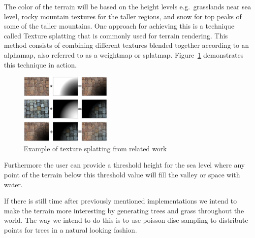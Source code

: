 The color of the terrain will be based on the height levels e.g.\ grasslands near sea level, rocky mountain textures for the taller regions, and snow for top peaks of some of the taller mountains.
One approach for achieving this is a technique called Texture splatting that is commonly used for terrain rendering.
This method consists of combining different textures blended together according to an alphamap, also referred to as a weightmap or splatmap.
Figure~\ref{fig:texture-splatting} demonstrates this technique in action.

\begin{figure}[h]
  \centering
  \includegraphics[width=0.4\textwidth]{figure/texture-splatting.png}
  \caption{Example of texture splatting from related work \cite{wiki:texture-splatting-img}}
  \label{fig:texture-splatting}
\end{figure}

Furthermore the user can provide a threshold height for the sea level where any point of the terrain below this threshold value will fill the valley or space with water.

If there is still time after previously mentioned implementations we intend to make the terrain more interesting by generating trees and grass throughout the world.
The way we intend to do this is to use poisson disc sampling to distribute points for trees in a natural looking fashion. %

